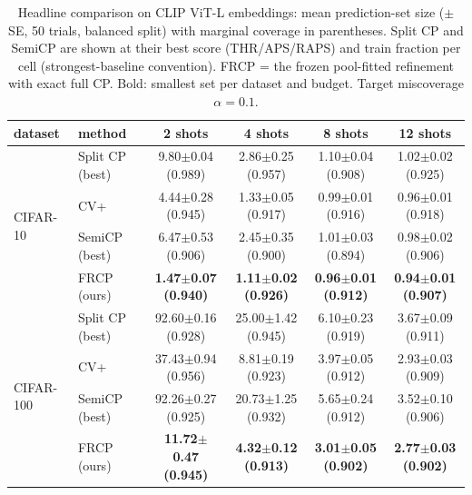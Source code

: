 %   
%   
\begin{table}[t]
\centering
\small
\caption{Headline comparison on CLIP ViT-L embeddings: mean prediction-set size ($\pm$ SE, 50 trials, balanced split) with marginal coverage in parentheses. Split CP and SemiCP are shown at their best score (THR/APS/RAPS) and train fraction per cell (strongest-baseline convention). FRCP = the frozen pool-fitted refinement with exact full CP. Bold: smallest set per dataset and budget. Target miscoverage $\alpha=0.1$.}
\label{tab:headline-clipl}
\begin{tabular}{llcccc}
\toprule
dataset & method & 2 shots & 4 shots & 8 shots & 12 shots\\
\midrule
\multirow{4}{*}{CIFAR-10} & Split CP (best) & 9.80$\pm$0.04 {\scriptsize(0.989)} & 2.86$\pm$0.25 {\scriptsize(0.957)} & 1.10$\pm$0.04 {\scriptsize(0.908)} & 1.02$\pm$0.02 {\scriptsize(0.925)}\\
 & CV+ & 4.44$\pm$0.28 {\scriptsize(0.945)} & 1.33$\pm$0.05 {\scriptsize(0.917)} & 0.99$\pm$0.01 {\scriptsize(0.916)} & 0.96$\pm$0.01 {\scriptsize(0.918)}\\
 & SemiCP (best) & 6.47$\pm$0.53 {\scriptsize(0.906)} & 2.45$\pm$0.35 {\scriptsize(0.900)} & 1.01$\pm$0.03 {\scriptsize(0.894)} & 0.98$\pm$0.02 {\scriptsize(0.906)}\\
 & FRCP (ours) & \textbf{1.47$\pm$0.07 {\scriptsize(0.940)}} & \textbf{1.11$\pm$0.02 {\scriptsize(0.926)}} & \textbf{0.96$\pm$0.01 {\scriptsize(0.912)}} & \textbf{0.94$\pm$0.01 {\scriptsize(0.907)}}\\
\midrule
\multirow{4}{*}{CIFAR-100} & Split CP (best) & 92.60$\pm$0.16 {\scriptsize(0.928)} & 25.00$\pm$1.42 {\scriptsize(0.945)} & 6.10$\pm$0.23 {\scriptsize(0.919)} & 3.67$\pm$0.09 {\scriptsize(0.911)}\\
 & CV+ & 37.43$\pm$0.94 {\scriptsize(0.956)} & 8.81$\pm$0.19 {\scriptsize(0.923)} & 3.97$\pm$0.05 {\scriptsize(0.912)} & 2.93$\pm$0.03 {\scriptsize(0.909)}\\
 & SemiCP (best) & 92.26$\pm$0.27 {\scriptsize(0.925)} & 20.73$\pm$1.25 {\scriptsize(0.932)} & 5.65$\pm$0.24 {\scriptsize(0.912)} & 3.52$\pm$0.10 {\scriptsize(0.906)}\\
 & FRCP (ours) & \textbf{11.72$\pm$0.47 {\scriptsize(0.945)}} & \textbf{4.32$\pm$0.12 {\scriptsize(0.913)}} & \textbf{3.01$\pm$0.05 {\scriptsize(0.902)}} & \textbf{2.77$\pm$0.03 {\scriptsize(0.902)}}\\

\end{tabular}
\end{table}
